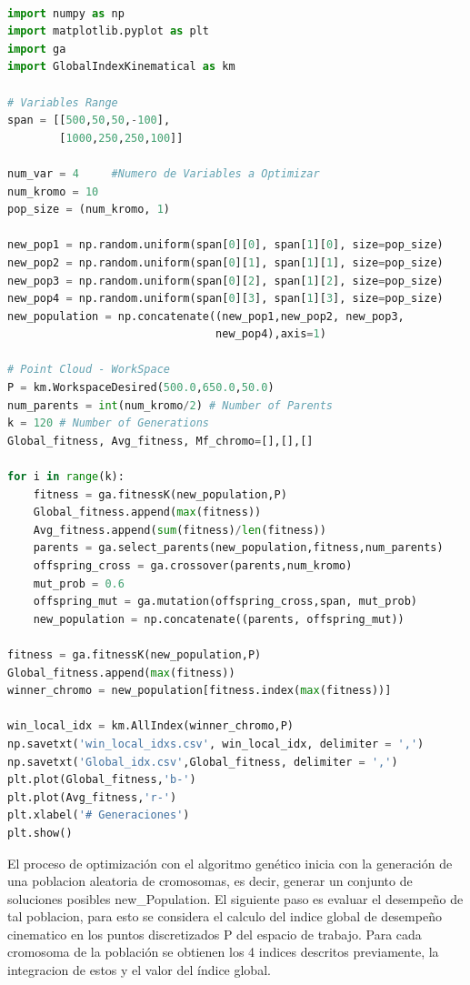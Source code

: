 ~
\begin{lstlisting}[frame=single,language = python]  % Start your code-block
import numpy as np
import matplotlib.pyplot as plt
import ga
import GlobalIndexKinematical as km

# Variables Range
span = [[500,50,50,-100],
        [1000,250,250,100]]

num_var = 4     #Numero de Variables a Optimizar
num_kromo = 10
pop_size = (num_kromo, 1)

new_pop1 = np.random.uniform(span[0][0], span[1][0], size=pop_size)
new_pop2 = np.random.uniform(span[0][1], span[1][1], size=pop_size)
new_pop3 = np.random.uniform(span[0][2], span[1][2], size=pop_size)
new_pop4 = np.random.uniform(span[0][3], span[1][3], size=pop_size)
new_population = np.concatenate((new_pop1,new_pop2, new_pop3,
                                new_pop4),axis=1)

# Point Cloud - WorkSpace
P = km.WorkspaceDesired(500.0,650.0,50.0)
num_parents = int(num_kromo/2) # Number of Parents
k = 120 # Number of Generations
Global_fitness, Avg_fitness, Mf_chromo=[],[],[]

for i in range(k):
    fitness = ga.fitnessK(new_population,P)
    Global_fitness.append(max(fitness))
    Avg_fitness.append(sum(fitness)/len(fitness))
    parents = ga.select_parents(new_population,fitness,num_parents)
    offspring_cross = ga.crossover(parents,num_kromo)
    mut_prob = 0.6
    offspring_mut = ga.mutation(offspring_cross,span, mut_prob)
    new_population = np.concatenate((parents, offspring_mut))

fitness = ga.fitnessK(new_population,P)
Global_fitness.append(max(fitness))
winner_chromo = new_population[fitness.index(max(fitness))]

win_local_idx = km.AllIndex(winner_chromo,P)
np.savetxt('win_local_idxs.csv', win_local_idx, delimiter = ',')
np.savetxt('Global_idx.csv',Global_fitness, delimiter = ',')
plt.plot(Global_fitness,'b-')
plt.plot(Avg_fitness,'r-')
plt.xlabel('# Generaciones')
plt.show()
\end{lstlisting}

El proceso de optimización con el algoritmo genético inicia con la generación de una poblacion aleatoria de cromosomas, es decir, generar un conjunto de soluciones posibles new\_Population. El siguiente paso es evaluar el desempeño de tal poblacion, para esto se considera el calculo del indice global de desempeño cinematico en los puntos discretizados P del espacio de trabajo. Para cada cromosoma de la población se obtienen los 4 indices descritos previamente, la integracion de estos y el valor del índice global.

